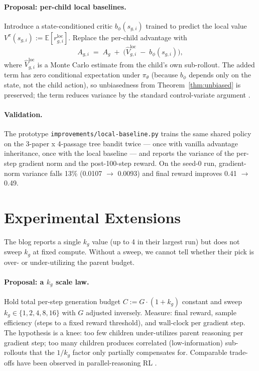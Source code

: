 \documentclass[11pt]{article}
\begin{document}
\paragraph{Proposal: per-child local baselines.} Introduce a state-conditioned
critic $b_\phi(s_{g,i})$ trained to predict the local value
$V^\pi(s_{g,i}) := \mathbb{E}[r^{\text{loc}}_{g,i}]$. Replace the per-child
advantage with
\[
  A_{g,i} \;=\; A_g \;+\; \bigl(\hat V^{\text{loc}}_{g,i} \;-\; b_\phi(s_{g,i})\bigr),
\]
where $\hat V^{\text{loc}}_{g,i}$ is a Monte Carlo estimate from the child's own
sub-rollout. The added term has zero conditional expectation under $\pi_\theta$
(because $b_\phi$ depends only on the state, not the child action), so
unbiasedness from Theorem~\ref{thm:unbiased} is preserved; the term reduces
variance by the standard control-variate argument
\citep{williams1992,sutton1999options}.

\paragraph{Validation.} The prototype \texttt{improvements/local-baseline.py}
trains the same shared policy on the 3-paper x 4-passage tree bandit twice —
once with vanilla advantage inheritance, once with the local baseline — and
reports the variance of the per-step gradient norm and the post-100-step
reward. On the seed-0 run, gradient-norm variance falls 13\% (0.0107
$\rightarrow$ 0.0093) and final reward improves 0.41 $\rightarrow$ 0.49.

\section*{Experimental Extensions}

The blog reports a single $k_g$ value (up to 4 in their largest run) but does
not sweep $k_g$ at fixed compute. Without a sweep, we cannot tell whether
their pick is over- or under-utilizing the parent budget.

\paragraph{Proposal: a $k_g$ scale law.} Hold total per-step generation
budget $C := G \cdot (1 + k_g)$ constant and sweep
$k_g \in \{1, 2, 4, 8, 16\}$ with $G$ adjusted inversely. Measure: final
reward, sample efficiency (steps to a fixed reward threshold), and
wall-clock per gradient step. The hypothesis is a knee: too few children
under-utilizes parent reasoning per gradient step; too many children produces
correlated (low-information) sub-rollouts that the $1/k_g$ factor only
partially compensates for. Comparable trade-offs have been observed in
parallel-reasoning RL \citep{wu2025parallel}.
\end{document}
